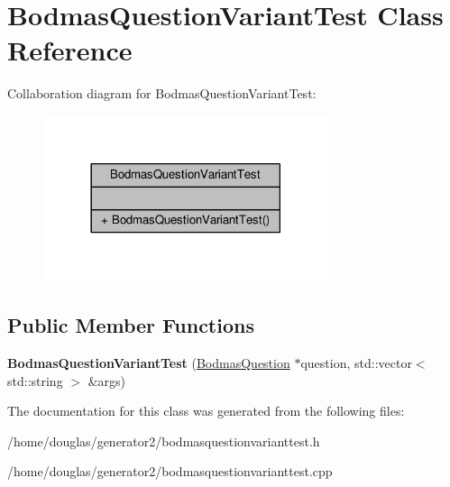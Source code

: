 \hypertarget{classBodmasQuestionVariantTest}{}\section{Bodmas\+Question\+Variant\+Test Class Reference}
\label{classBodmasQuestionVariantTest}


Collaboration diagram for Bodmas\+Question\+Variant\+Test\+:
\nopagebreak
\begin{figure}[H]
\begin{center}
\leavevmode
\includegraphics[width=237pt]{classBodmasQuestionVariantTest__coll__graph}
\end{center}
\end{figure}
\subsection*{Public Member Functions}
\begin{DoxyCompactItemize}
\item 
{\bfseries Bodmas\+Question\+Variant\+Test} (\hyperlink{classBodmasQuestion}{Bodmas\+Question} $\ast$question, std\+::vector$<$ std\+::string $>$ \&args)\hypertarget{classBodmasQuestionVariantTest_a17cf4ed12ca4012b4d11a54226191448}{}\label{classBodmasQuestionVariantTest_a17cf4ed12ca4012b4d11a54226191448}

\end{DoxyCompactItemize}


The documentation for this class was generated from the following files\+:\begin{DoxyCompactItemize}
\item 
/home/douglas/generator2/bodmasquestionvarianttest.\+h\item 
/home/douglas/generator2/bodmasquestionvarianttest.\+cpp\end{DoxyCompactItemize}
